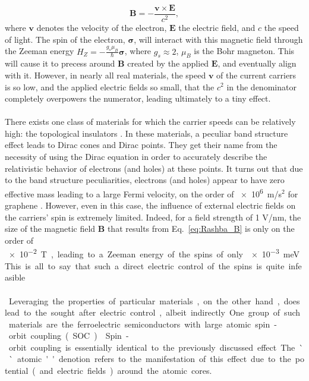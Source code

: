 \begin{equation}
	\label{eq:Rashba_B}
	\bm{B} = - \frac{\bm v \times \bm E}{c^2},
\end{equation}
where $\bm v$ denotes the velocity of the electron, $\bm E$ the electric field, and $c$ the speed of light.
The spin of the electron, $\bm{\sigma}$, will interact with this magnetic field through the Zeeman energy $H_Z = -\frac{g_s\mu_B}{\hbar} \bm{\sigma}$, where $g_s \approx 2$, $\mu_B$ is the Bohr magneton.
This will cause it to precess around $\bm B$ created by the applied $\bm E$, and eventually align with it.
However, in nearly all real materials, the speed $\bm v$ of the current carriers is so low, and the applied electric fields so small, that the $c^2$ in the denominator completely overpowers the numerator, leading ultimately to a tiny effect.
\\\\
There exists one class of materials for which the carrier speeds can be relatively high: the topological insulators \cite{Kane2005a,Novoselov2005,CastroNeto2009,Fu2007,Fu2006,Pesin2012}.
In these materials, a peculiar band structure effect leads to Dirac cones and Dirac points. They get their name from the necessity of using the Dirac equation in order to accurately describe the relativistic behavior of electrons (and holes) at these points.
It turns out that due to the band structure peculiarities, electrons (and holes) appear to have zero effective mass leading to a large Fermi velocity, on the order of \SI{e6}m/s$^2$ for graphene \cite{Novoselov2005}.   
However, even in this case, the influence of external electric fields on the carriers' spin is extremely limited.
Indeed, for a field strength of 1 V/nm, the size of the magnetic field $\bm B$ that results from Eq.~\eqref{eq:Rashba_B} is only on the order of \SI{e-2} T, leading to a Zeeman energy of the spins of only \SI{e-3} meV.
This is all to say that such a direct electric control of the spins is quite infeasible.
\\\\
Leveraging the properties of particular materials, on the other hand, does lead to the sought after electric control, albeit indirectly.
One group of such materials are the ferroelectric semiconductors with large atomic spin-orbit coupling (SOC) \cite{Picozzi2014,DiSante2013,Ishizaka2011,Kim2014}.
Spin-orbit coupling is essentially identical to the previously discussed effect.
The ``atomic'' denotion refers to the manifestation of this effect due to the potential (and electric fields) around the atomic cores.
